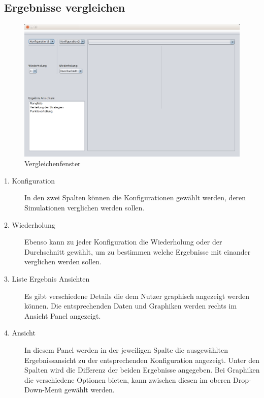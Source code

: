 \pagebreak


\subsection{Ergebnisse vergleichen}

\begin{figure}[!hp] 
  \centering
     \includegraphics[width=1.15\textwidth]{GUI_Entwurf/Vergleichfenster.png}
  \caption{Vergleichenfenster}
  \label{fig:Bild1}
\end{figure}

\begin{description}

\item[1. Konfiguration] In den zwei Spalten können die Konfigurationen gewählt werden, deren Simulationen verglichen werden sollen.

\item[2. Wiederholung] Ebenso kann zu jeder Konfiguration die Wiederholung oder der Durchschnitt gewählt, um zu bestimmen welche Ergebnisse mit einander verglichen werden sollen.

\item[3. Liste Ergebnis Ansichten] Es gibt verschiedene Details die dem Nutzer graphisch angezeigt werden können. Die entsprechenden Daten und Graphiken werden rechts im Ansicht Panel angezeigt.


\item[4. Ansicht] In diesem Panel werden in der jeweiligen Spalte die ausgewählten Ergebnissansicht zu der entsprechenden Konfiguration angezeigt. Unter den Spalten wird die Differenz der beiden Ergebnisse angegeben. Bei Graphiken die verschiedene Optionen bieten, kann zwischen diesen im oberen Drop-Down-Menü gewählt werden.

\end{description}



